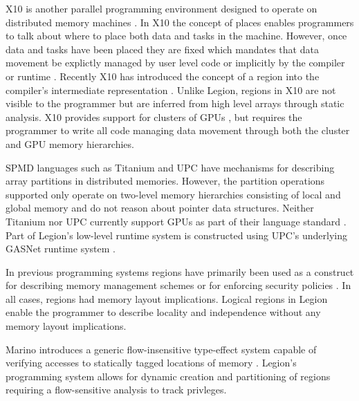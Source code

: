X10 is another parallel programming environment designed to operate on distributed
memory machines \cite{X1005}.  In X10 the concept of places enables programmers to talk about where
to place both data and tasks in the machine.  However, once data and tasks have
been placed they are fixed which mandates that data movement be explictly managed by
user level code or implicitly by the compiler or runtime \cite{X1008}.  Recently X10 has introduced
the concept of a region into the compiler's intermediate representation \cite{X1011}.
Unlike Legion, regions in X10 are not visible to the programmer but are inferred
from high level arrays through static analysis.  X10 provides support for clusters of GPUs
\cite{X10GPU}, but requires the programmer to write all code managing data movement
through both the cluster and GPU memory hierarchies.

SPMD languages such as Titanium \cite{JV:Yel98} and UPC \cite{UPC99} have mechanisms for
describing array partitions in distributed memories.  However, the partition
operations supported only operate on two-level memory hierarchies consisting of local
and global memory and do not reason about pointer data structures.  Neither Titanium
nor UPC currently support GPUs as part of their language standard \cite{TITANIUMSTANDARD}
\cite{UPCSTANDARD}.  Part of Legion's 
low-level runtime system is constructed using UPC's underlying GASNet 
runtime system \cite{GASNET07}. 

In previous programming systems regions have primarily been used as a construct for
describing memory management schemes \cite{REAPS02}\cite{RC01}  
or for enforcing security policies \cite{CYCLONE01}.  In all cases, regions had
memory layout implications.  Logical regions in Legion enable the programmer to
describe locality and independence without any memory layout implications.

Marino introduces a generic flow-insensitive type-effect system capable of verifying 
accesses to statically tagged locations of memory \cite{PRIVLIGES09}.  Legion's programming
system allows for dynamic creation and partitioning of regions requiring a 
flow-sensitive analysis to track privleges.
